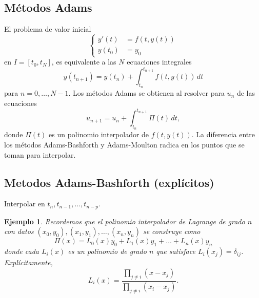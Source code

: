 \documentclass[11pt,letterpaper]{report}
\newtheorem{example}{Ejemplo}
\begin{document}
\subsection{Métodos Adams}

El problema de valor inicial
\begin{equation}
  \left\{
    \begin{aligned}
      y'(t) &= f(t,y(t)) \\
      y(t_0) &= y_0
    \end{aligned}
  \right.
\end{equation}
en $I=[t_0,t_N]$, es equivalente a las $N$ ecuaciones integrales
\begin{equation}
  y(t_{n+1}) = y(t_n) + \int_{t_n}^{t_{n+1}}\! f(t,y(t))\,dt
\end{equation}
para $n=0,\dots,N-1$. Los métodos Adams se obtienen al resolver para
$u_n$ de las ecuaciones
\begin{equation}
  u_{n+1} = u_n + \int_{t_n}^{t_{n+1}}\Pi(t)\,dt,
\end{equation}
donde $\Pi(t)$ es un polinomio interpolador de $f(t,y(t))$.
La diferencia entre los métodos Adams-Bashforth y Adams-Moulton
radica en los puntos que se toman para interpolar.

\subsection{Metodos Adams-Bashforth (explícitos)}
Interpolar en $t_{n},t_{n-1},\dots,t_{n-p}$.

\begin{example}
  Recordemos que el polinomio interpolador de Lagrange de grado $n$ 
  con datos $(x_0,y_0),(x_1,y_1),\dots,(x_n,y_n)$ se construye como
  \begin{equation}
    \Pi(x) =  L_0(x)y_0 + L_1(x)y_1 + \dots + L_n(x)y_n
  \end{equation}
  donde cada $L_i(x)$ es un polinomio de grado $n$ que satisface
  $L_i(x_j)=\delta_{ij}$. Explícitamente,
  \begin{equation}
    L_i(x) = \frac{\prod_{j\neq i}(x-x_j)}{\prod_{j\neq i}(x_i-x_j)}
  .\end{equation}
\end{example}
\end{document}
